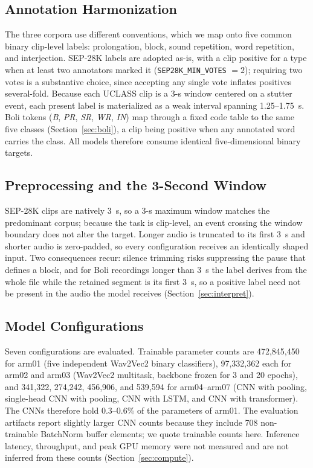 \documentclass[a4paper,orivec]{llncs}
\begin{document}
\subsection{Annotation Harmonization}
The three corpora use different conventions, which we map onto five common
binary clip-level labels: prolongation, block, sound repetition, word
repetition, and interjection. SEP-28K labels are adopted as-is, with a clip
positive for a type when at least two annotators marked it
(\texttt{SEP28K\_MIN\_VOTES} $=2$); requiring two votes is a substantive choice,
since accepting any single vote inflates positives several-fold. Because each
UCLASS clip is a 3-s window centered on a stutter event, each present label is
materialized as a weak interval spanning 1.25--1.75~s. Boli tokens
(\emph{B}, \emph{PR}, \emph{SR}, \emph{WR}, \emph{IN}) map through a fixed code
table to the same five classes (Section~\ref{sec:boli}), a clip being positive
when any annotated word carries the class. All models therefore consume identical
five-dimensional binary targets.

\subsection{Preprocessing and the 3-Second Window}
\label{sec:win}
SEP-28K clips are natively 3~s, so a 3-s maximum window matches the predominant
corpus; because the task is clip-level, an event crossing the window boundary
does not alter the target. Longer audio is truncated to its first 3~s and shorter
audio is zero-padded, so every configuration receives an identically shaped input.
Two consequences recur: silence trimming risks suppressing the pause that defines
a block, and for Boli recordings longer than 3~s the label derives from the whole
file while the retained segment is its first 3~s, so a positive label need not be
present in the audio the model receives (Section~\ref{sec:interpret}).

\subsection{Model Configurations}
Seven configurations are evaluated. Trainable parameter counts are 472{,}845{,}450
for arm01 (five independent Wav2Vec2 binary classifiers), 97{,}332{,}362 each for
arm02 and arm03 (Wav2Vec2 multitask, backbone frozen for 3 and 20 epochs), and
341{,}322, 274{,}242, 456{,}906, and 539{,}594 for arm04--arm07 (CNN with pooling,
single-head CNN with pooling, CNN with LSTM, and CNN with transformer). The CNNs
therefore hold 0.3--0.6\% of the parameters of arm01. The evaluation artifacts
report slightly larger CNN counts because they include 708 non-trainable
BatchNorm buffer elements; we quote trainable counts here. Inference latency,
throughput, and peak GPU memory were not measured and are not inferred from these
counts (Section~\ref{sec:compute}).
\end{document}
